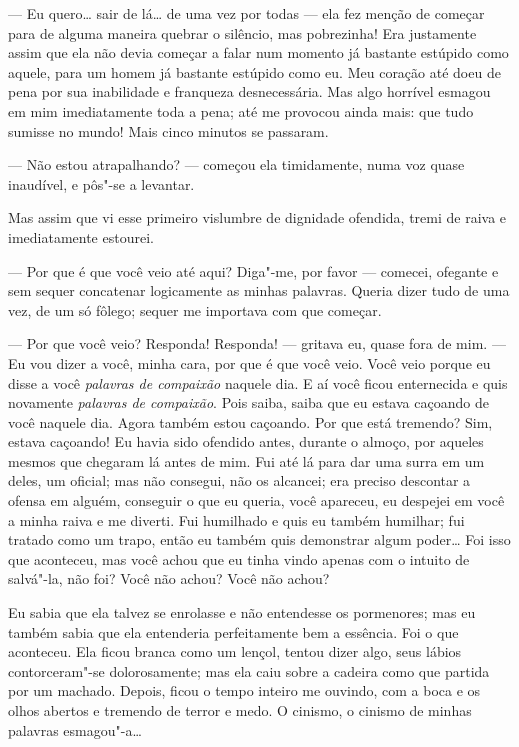 --- Eu quero\ldots{} sair de lá\ldots{} de uma vez por todas --- ela fez menção de
começar para de alguma maneira quebrar o silêncio, mas pobrezinha! Era
justamente assim que ela não devia começar a falar num momento já
bastante estúpido como aquele, para um homem já bastante estúpido como
eu. Meu coração até doeu de pena por sua inabilidade e franqueza
desnecessária. Mas algo horrível esmagou em mim imediatamente toda a
pena; até me provocou ainda mais: que tudo sumisse no mundo! Mais cinco
minutos se passaram.

--- Não estou atrapalhando? --- começou ela timidamente, numa voz quase
inaudível, e pôs"-se a levantar.

Mas assim que vi esse primeiro vislumbre de dignidade ofendida, tremi de
raiva e imediatamente estourei.

--- Por que é que você veio até aqui? Diga"-me, por favor --- comecei,
ofegante e sem sequer concatenar logicamente as minhas palavras. Queria
dizer tudo de uma vez, de um só fôlego; sequer me importava com que
começar.

--- Por que você veio? Responda! Responda! --- gritava eu, quase fora de mim.
--- Eu vou dizer a você, minha cara, por que é que você veio. Você veio porque
eu disse a você \textit{palavras de compaixão} naquele dia. E aí você ficou
enternecida e quis novamente \textit{palavras de compaixão}. Pois saiba, saiba que eu
estava caçoando de você naquele dia. Agora também estou caçoando. Por que está
tremendo? Sim, estava caçoando! Eu havia sido ofendido antes, durante o almoço,
por aqueles mesmos que chegaram lá antes de mim. Fui até lá para dar uma surra em um
deles, um oficial; mas não consegui, não os alcancei; era preciso descontar a
ofensa em alguém, conseguir o que eu queria, você apareceu, eu despejei em você
a minha raiva e me diverti. Fui humilhado e quis eu também humilhar; fui
tratado como um trapo, então eu também quis demonstrar algum poder\ldots{} Foi
isso que aconteceu, mas você achou que eu tinha vindo apenas com o intuito de
salvá"-la, não foi? Você não achou? Você não achou?

Eu sabia que ela talvez se enrolasse e não entendesse os pormenores; mas
eu também sabia que ela entenderia perfeitamente bem a essência. Foi o
que aconteceu. Ela ficou branca como um lençol, tentou dizer algo, seus
lábios contorceram"-se dolorosamente; mas ela caiu sobre a cadeira como
que partida por um machado. Depois, ficou o tempo inteiro me ouvindo,
com a boca e os olhos abertos e tremendo de terror e medo. O cinismo, o
cinismo de minhas palavras esmagou"-a\ldots{}


